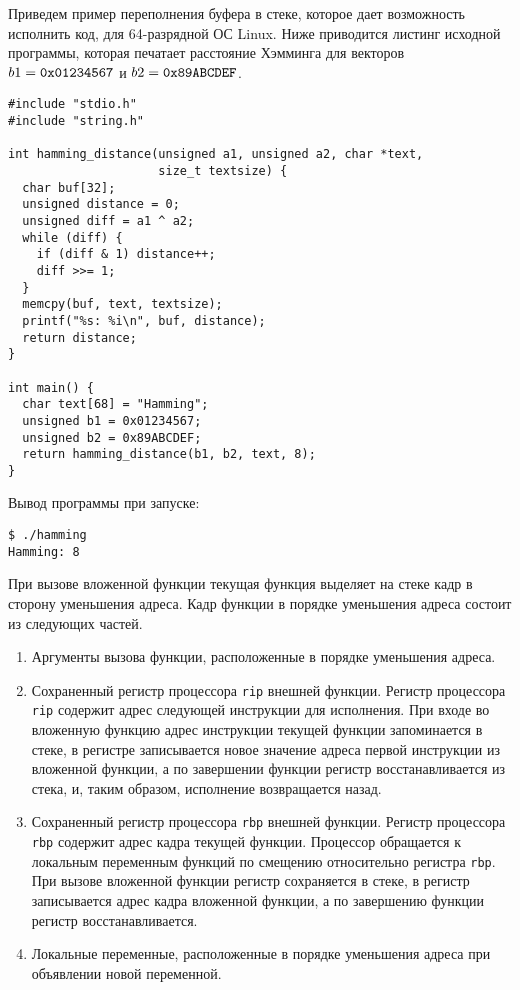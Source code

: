 Приведем пример переполнения буфера в стеке, которое дает возможность исполнить код, для 64-разрядной ОС Linux. Ниже приводится листинг исходной программы, которая печатает расстояние Хэмминга для векторов $b1 = \text{\texttt{0x01234567}}$ и $b2 = \text{\texttt{0x89ABCDEF}}$.

\begin{verbatim}
#include "stdio.h"
#include "string.h"

int hamming_distance(unsigned a1, unsigned a2, char *text,
                     size_t textsize) {
  char buf[32];
  unsigned distance = 0;
  unsigned diff = a1 ^ a2;
  while (diff) {
    if (diff & 1) distance++;
    diff >>= 1;
  }
  memcpy(buf, text, textsize);
  printf("%s: %i\n", buf, distance);
  return distance;
}

int main() {
  char text[68] = "Hamming";
  unsigned b1 = 0x01234567;
  unsigned b2 = 0x89ABCDEF;
  return hamming_distance(b1, b2, text, 8);
}
\end{verbatim}

Вывод программы при запуске:
\begin{verbatim}
$ ./hamming
Hamming: 8
\end{verbatim}

При вызове вложенной функции текущая функция выделяет на стеке кадр в сторону уменьшения адреса. Кадр функции в порядке уменьшения адреса состоит из следующих частей.
\begin{enumerate}
    \item Аргументы вызова функции, расположенные в порядке уменьшения адреса.
    \item Сохраненный регистр процессора \texttt{rip} внешней функции. Регистр процессора \texttt{rip} содержит адрес следующей инструкции для исполнения. При входе во вложенную функцию адрес инструкции текущей функции запоминается в стеке, в регистре записывается новое значение адреса первой инструкции из вложенной функции, а по завершении функции регистр восстанавливается из стека, и, таким образом, исполнение возвращается назад.
    \item Сохраненный регистр процессора \texttt{rbp} внешней функции. Регистр процессора \texttt{rbp} содержит адрес кадра текущей функции. Процессор обращается к локальным переменным функций по смещению относительно регистра \texttt{rbp}. При вызове вложенной функции регистр сохраняется в стеке, в регистр записывается адрес кадра вложенной функции, а по завершению функции регистр восстанавливается.
    \item Локальные переменные, расположенные в порядке уменьшения адреса при объявлении новой переменной.
\end{enumerate}

